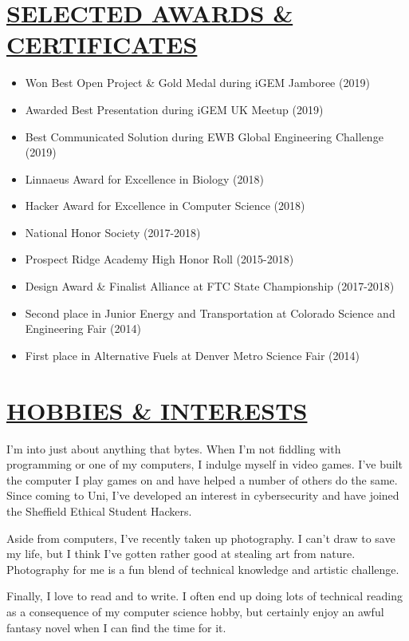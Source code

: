 \documentclass[twocolumn, a4paper, fontsize=9pt, headsepline, footsepline]{scrartcl}
\begin{document}
\section*{\ul{SELECTED AWARDS \& CERTIFICATES}}
\begin{itemize}
\item Won Best Open Project \& Gold Medal during iGEM Jamboree (2019)
\item Awarded Best Presentation during iGEM UK Meetup (2019)
\item Best Communicated Solution during EWB Global Engineering Challenge (2019)
\item Linnaeus Award for Excellence in Biology (2018)
\item Hacker Award for Excellence in Computer Science (2018)
\item National Honor Society (2017-2018)
\item Prospect Ridge Academy High Honor Roll (2015-2018)
\item Design Award \& Finalist Alliance at FTC State Championship (2017-2018)
\item Second place in Junior Energy and Transportation at Colorado Science and
  Engineering Fair (2014)
\item First place in Alternative Fuels at Denver Metro Science Fair (2014)
\end{itemize}
\section*{\ul{HOBBIES \& INTERESTS}}
\noindent
I'm into just about anything that bytes. When I'm not fiddling with programming
or one of my computers, I indulge myself in video games. I've built the computer
I play games on and have helped a number of others do the same. Since coming to
Uni, I've developed an interest in cybersecurity and have joined the Sheffield
Ethical Student Hackers.

Aside from computers, I've recently taken up photography. I can't draw to save
my life, but I think I've gotten rather good at stealing art from
nature. Photography for me is a fun blend of technical knowledge and artistic
challenge.

Finally, I love to read and to write. I often end up doing lots of technical
reading as a consequence of my computer science hobby, but certainly enjoy an
awful fantasy novel when I can find the time for it.
\end{document}

